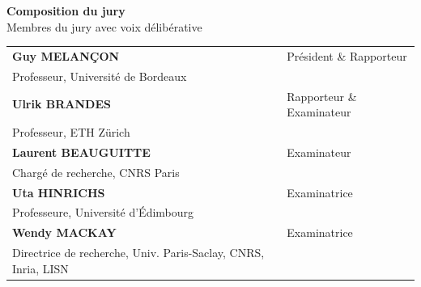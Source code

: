 \documentclass[12pt,a4paper, twoside, headings=small]{book}
\begin{document}
\begin{titlepage}
        \bigskip

        \flushleft
        \normalsize {\color{Prune} \textbf{Composition du jury}}\\
        \small {\color{Prune} Membres du jury avec voix délibérative}\\

        \vspace{2mm}
        \scriptsize

        \begin{tabular}{|p{9cm}l}
            \arrayrulecolor{Prune}
            \textbf{Guy MELANÇON} & Président \& Rapporteur \\
            Professeur, Université de Bordeaux  &                                   \\
            \textbf{Ulrik BRANDES} & Rapporteur \& Examinateur \\
            Professeur, ETH Zürich  &                                   \\
            \textbf{Laurent BEAUGUITTE} & Examinateur       \\
            Chargé de recherche, CNRS Paris  &                                   \\
            \textbf{Uta HINRICHS} & Examinatrice       \\
            Professeure, Université d'Édimbourg  &                                   \\
            \textbf{Wendy MACKAY} & Examinatrice       \\
            Directrice de recherche, Univ. Paris-Saclay, CNRS, Inria, LISN  &   \\
        \end{tabular}
    \end{titlepage}

    \Ifthispageodd{\newpage\thispagestyle{empty}\null\newpage}{}
    \thispagestyle{empty}
    \selectfont
\end{document}
